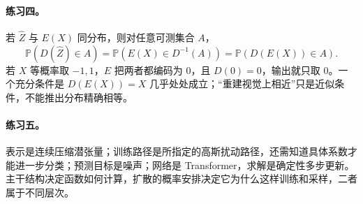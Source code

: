 \paragraph{练习四。}
若 $\widehat Z$ 与 $E(X)$ 同分布，则对任意可测集合 $A$，
\[
 \mathbb P(D(\widehat Z)\in A)
 =\mathbb P(E(X)\in D^{-1}(A))
 =\mathbb P(D(E(X))\in A).
\]
若 $X$ 等概率取 $-1,1$，$E$ 把两者都编码为 $0$，且 $D(0)=0$，输出就只取 $0$。一个充分条件是 $D(E(X))=X$ 几乎处处成立；“重建视觉上相近”只是近似条件，不能推出分布精确相等。

\paragraph{练习五。}
表示是连续压缩潜张量；训练路径是所指定的高斯扰动路径，还需知道具体系数才能进一步分类；预测目标是噪声；网络是 Transformer，求解是确定性多步更新。主干结构决定函数如何计算，扩散的概率安排决定它为什么这样训练和采样，二者属于不同层次。

